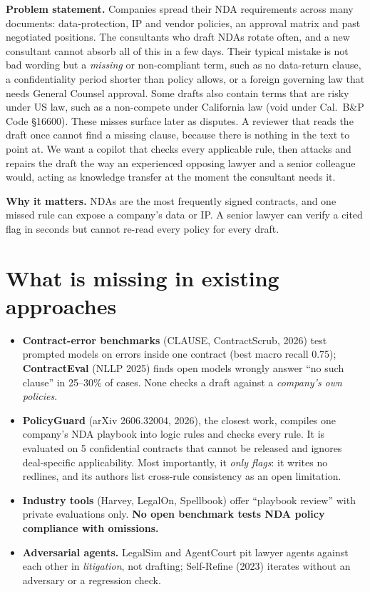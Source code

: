 \documentclass[11pt,a4paper]{article}
\begin{document}
\textbf{Problem statement.}
Companies spread their NDA requirements across many documents: data-protection, IP and vendor policies, an approval matrix and past negotiated positions.
The consultants who draft NDAs rotate often, and a new consultant cannot absorb all of this in a few days.
Their typical mistake is not bad wording but a \emph{missing} or non-compliant term, such as no data-return clause, a confidentiality period shorter than policy allows, or a foreign governing law that needs General Counsel approval.
Some drafts also contain terms that are risky under US law, such as a non-compete under California law (void under Cal.\ B\&P Code \S16600).
These misses surface later as disputes.
A reviewer that reads the draft once cannot find a missing clause, because there is nothing in the text to point at.
We want a copilot that checks every applicable rule, then attacks and repairs the draft the way an experienced opposing lawyer and a senior colleague would, acting as knowledge transfer at the moment the consultant needs it.

\textbf{Why it matters.} NDAs are the most frequently signed contracts, and one missed rule can expose a company's data or IP. A senior lawyer can verify a cited flag in seconds but cannot re-read every policy for every draft.

\section{What is missing in existing approaches}
\begin{itemize}
\item \textbf{Contract-error benchmarks} (CLAUSE, ContractScrub, 2026) test prompted models on errors inside one contract (best macro recall 0.75); \textbf{ContractEval} (NLLP 2025) finds open models wrongly answer ``no such clause'' in 25--30\% of cases. None checks a draft against a \emph{company's own policies}.
\item \textbf{PolicyGuard} (arXiv 2606.32004, 2026), the closest work, compiles one company's NDA playbook into logic rules and checks every rule. It is evaluated on 5 confidential contracts that cannot be released and ignores deal-specific applicability. Most importantly, it \emph{only flags}: it writes no redlines, and its authors list cross-rule consistency as an open limitation.
\item \textbf{Industry tools} (Harvey, LegalOn, Spellbook) offer ``playbook review'' with private evaluations only. \textbf{No open benchmark tests NDA policy compliance with omissions.}
\item \textbf{Adversarial agents.} LegalSim and AgentCourt pit lawyer agents against each other in \emph{litigation}, not drafting; Self-Refine (2023) iterates without an adversary or a regression check.
\end{itemize}
\end{document}
